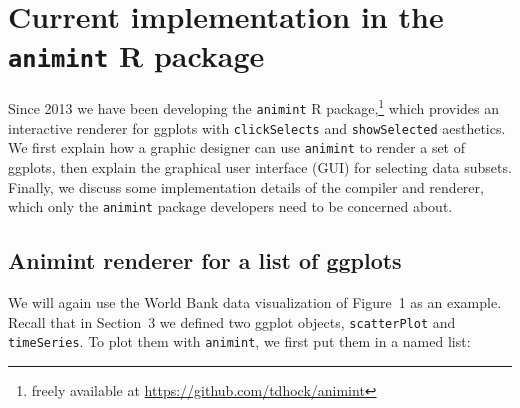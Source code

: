 \documentclass[12pt]{article}\usepackage[]{graphicx}\usepackage[]{color}
\begin{document}


\section{Current implementation in the \texttt{animint} R package}

Since 2013 we have been developing the \texttt{animint} R
package,\footnote{freely available at
  \url{https://github.com/tdhock/animint}} which provides an
interactive renderer for ggplots with \texttt{clickSelects} and
\texttt{showSelected} aesthetics. We first explain how a graphic
designer can use \texttt{animint} to render a set of ggplots, then explain the
graphical user interface (GUI) for selecting data subsets. Finally, we
discuss some implementation details of the compiler and renderer,
which only the \texttt{animint} package developers need to be concerned about.

\subsection{Animint renderer for a list of ggplots}

We will again use the World Bank data visualization of Figure~1 as an
example. Recall that in Section~3 we defined two ggplot objects,
\texttt{scatterPlot} and \texttt{timeSeries}. To plot them with
\texttt{animint}, we first put them in a named list:
\end{document}
